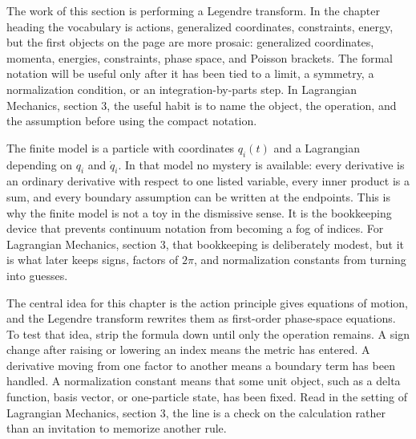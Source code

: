 











The work of this section is performing a Legendre transform.  In the chapter heading the vocabulary is actions, generalized coordinates, constraints, energy, but the first objects on the page are more prosaic: generalized coordinates, momenta, energies, constraints, phase space, and Poisson brackets.  The formal notation will be useful only after it has been tied to a limit, a symmetry, a normalization condition, or an integration-by-parts step.  In Lagrangian Mechanics, section 3, the useful habit is to name the object, the operation, and the assumption before using the compact notation.

The finite model is a particle with coordinates \(q_i(t)\) and a Lagrangian depending on \(q_i\) and \(\dot q_i\).  In that model no mystery is available: every derivative is an ordinary derivative with respect to one listed variable, every inner product is a sum, and every boundary assumption can be written at the endpoints.  This is why the finite model is not a toy in the dismissive sense.  It is the bookkeeping device that prevents continuum notation from becoming a fog of indices.  For Lagrangian Mechanics, section 3, that bookkeeping is deliberately modest, but it is what later keeps signs, factors of \(2\pi\), and normalization constants from turning into guesses.

The central idea for this chapter is the action principle gives equations of motion, and the Legendre transform rewrites them as first-order phase-space equations.  To test that idea, strip the formula down until only the operation remains.  A sign change after raising or lowering an index means the metric has entered.  A derivative moving from one factor to another means a boundary term has been handled.  A normalization constant means that some unit object, such as a delta function, basis vector, or one-particle state, has been fixed.  Read in the setting of Lagrangian Mechanics, section 3, the line is a check on the calculation rather than an invitation to memorize another rule.

